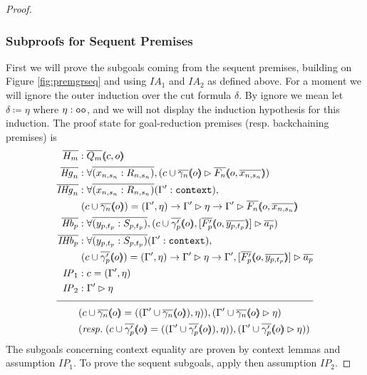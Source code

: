 \begin{proof}
\subsubsection{Subproofs for Sequent Premises}
\label{subsubsec:cutpfseqprem}

First we will prove the subgoals coming from the sequent premises, building on Figure \ref{fig:premgrseq} and using $\mathit{IA}_1$ and $\mathit{IA}_2$ as defined above. For a moment we will ignore the outer induction over the cut formula $\delta$. By ignore we mean let $\delta \coloneqq \eta$ where $\eta : \texttt{oo}$, and we will not display the induction hypothesis for this induction. The proof state for goal-reduction premises (resp. backchaining premises) is
\begin{align*}
\ol{H_m} &: \ol{Q_m} \args{c , o} \\
\ol{\mathit{Hg}_n} &: \forall \ol{(x_{n,s_n} : R_{n,s_n})}, (\seqsl[c \cup \ol{\gamma_n} \args{o}]{\ol{F_n} \args{o , \ol{x_{n,s_n}}})} \\
\ol{\mathit{IHg}_n} &: \forall \ol{(x_{n,s_n} : R_{n,s_n})} (\inddyncon{} : \sltm{context}), \\
& \; (c \cup \ol{\gamma_n} \args{o}) = (\inddyncon{} , \eta) \rightarrow \seqsl[\inddyncon{}]{\eta} \rightarrow \seqsl[\inddyncon{}]{\ol{F_n} \args{o , \ol{x_{n,s_n}}}} \\
\ol{\mathit{Hb}_p} &: \forall \ol{(y_{p,t_p} : S_{p,t_p})}, (\bchsl[c \cup \ol{\gamma'_p} \args{o}]{\ol{F'_p} \args{o , \ol{y_{p,t_p}}}}{\ol{a_p}}) \\
\ol{\mathit{IHb}_p} &: \forall \ol{(y_{p,t_p} : S_{p,t_p})} (\inddyncon{} : \sltm{context}), \\
& \; (c \cup \ol{\gamma'_p} \args{o}) = (\inddyncon{} , \eta) \rightarrow \seqsl[\inddyncon{}]{\eta} \rightarrow \bchsl[\inddyncon{}]{\ol{F'_p} \args{o , \ol{y_{p,t_p}}}}{\ol{a_p}} \\
\mathit{IP}_1 &: c = (\inddyncon{} , \eta) \\
\mathit{IP}_2 &: \seqsl[\inddyncon{}]{\eta} \\[\pfshift{}]
\cline{1-2}
& (c \cup \ol{\gamma_n} \args{o} = ((\inddyncon{} \cup \ol{\gamma_n} \args{o}) , \eta)) , (\seqsl[\inddyncon{} \cup \ol{\gamma_n} \args{o}]{\eta}) \\
& (\mathit{resp.} \; (c \cup \ol{\gamma'_p} \args{o} = ((\inddyncon{} \cup \ol{\gamma'_p} \args{o}) , \eta)) , (\seqsl[\inddyncon{} \cup \ol{\gamma'_p} \args{o}]{\eta}))
\end{align*}
The subgoals concerning context equality are proven by context lemmas and assumption $\mathit{IP}_1$. To prove the sequent subgoals, apply  then assumption $\mathit{IP}_2$.


\end{proof}
